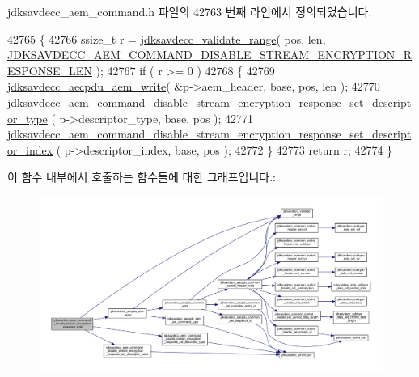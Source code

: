 jdksavdecc\+\_\+aem\+\_\+command.\+h 파일의 42763 번째 라인에서 정의되었습니다.


\begin{DoxyCode}
42765 \{
42766     ssize\_t r = \hyperlink{group__util_ga9c02bdfe76c69163647c3196db7a73a1}{jdksavdecc\_validate\_range}( pos, len, 
      \hyperlink{group__command__disable__stream__encryption__response_gaf504a02072cd6345fccae3b1330fc376}{JDKSAVDECC\_AEM\_COMMAND\_DISABLE\_STREAM\_ENCRYPTION\_RESPONSE\_LEN}
       );
42767     \textcolor{keywordflow}{if} ( r >= 0 )
42768     \{
42769         \hyperlink{group__aecpdu__aem_gad658e55771cce77cecf7aae91e1dcbc5}{jdksavdecc\_aecpdu\_aem\_write}( &p->aem\_header, base, pos, len );
42770         
      \hyperlink{group__command__disable__stream__encryption__response_ga7affde1d3606b5444b9e26b7ae973601}{jdksavdecc\_aem\_command\_disable\_stream\_encryption\_response\_set\_descriptor\_type}
      ( p->descriptor\_type, base, pos );
42771         
      \hyperlink{group__command__disable__stream__encryption__response_ga1722721f61828485c903699667c85848}{jdksavdecc\_aem\_command\_disable\_stream\_encryption\_response\_set\_descriptor\_index}
      ( p->descriptor\_index, base, pos );
42772     \}
42773     \textcolor{keywordflow}{return} r;
42774 \}
\end{DoxyCode}


이 함수 내부에서 호출하는 함수들에 대한 그래프입니다.\+:
\nopagebreak
\begin{figure}[H]
\begin{center}
\leavevmode
\includegraphics[width=350pt]{group__command__disable__stream__encryption__response_ga372119b9606e2f3c89f10b768027c7d9_cgraph}
\end{center}
\end{figure}


